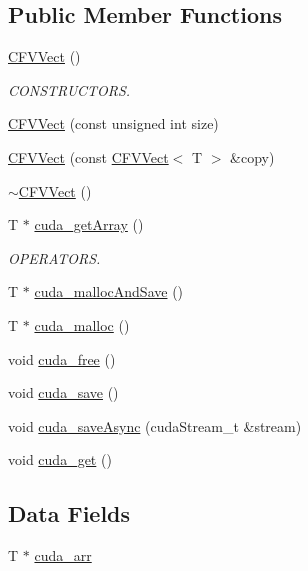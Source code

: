 \subsection*{Public Member Functions}
\begin{DoxyCompactItemize}
\item 
\hyperlink{classFVL_1_1CFVVect_a28087ccfe3e534b4d0f7170b533d3f85}{CFVVect} ()
\begin{DoxyCompactList}\small\item\em CONSTRUCTORS. \item\end{DoxyCompactList}\item 
\hyperlink{classFVL_1_1CFVVect_a82c1efb21c099ef3cfb948438c71754b}{CFVVect} (const unsigned int size)
\item 
\hyperlink{classFVL_1_1CFVVect_a018e0003ee7028fd198ce378d5a77521}{CFVVect} (const \hyperlink{classFVL_1_1CFVVect}{CFVVect}$<$ T $>$ \&copy)
\item 
\hyperlink{classFVL_1_1CFVVect_a9e41f020292fa3b80a37c17da39f5bb2}{$\sim$CFVVect} ()
\item 
T $\ast$ \hyperlink{classFVL_1_1CFVVect_a79c842ffa963500e75bb49038b5a91cf}{cuda\_\-getArray} ()
\begin{DoxyCompactList}\small\item\em OPERATORS. \item\end{DoxyCompactList}\item 
T $\ast$ \hyperlink{classFVL_1_1CFVVect_a91b72217e89ae594799cf6f5d5e790fb}{cuda\_\-mallocAndSave} ()
\item 
T $\ast$ \hyperlink{classFVL_1_1CFVVect_ac5b54e1d7aacbc7ac8f947cc8403143e}{cuda\_\-malloc} ()
\item 
void \hyperlink{classFVL_1_1CFVVect_a7da37a3af0dbb3b115a980bf13d30d02}{cuda\_\-free} ()
\item 
void \hyperlink{classFVL_1_1CFVVect_af496393c6fc22710b80e2dcb735ccce7}{cuda\_\-save} ()
\item 
void \hyperlink{classFVL_1_1CFVVect_abde9b4b5738a7aeb95290249a3035ab5}{cuda\_\-saveAsync} (cudaStream\_\-t \&stream)
\item 
void \hyperlink{classFVL_1_1CFVVect_add025b0a8b98e7d4d6e631bbaf30b088}{cuda\_\-get} ()
\end{DoxyCompactItemize}
\subsection*{Data Fields}
\begin{DoxyCompactItemize}
\item 
T $\ast$ \hyperlink{classFVL_1_1CFVVect_ac7c2eda2752dff79215dfcc062d0d814}{cuda\_\-arr}
\end{DoxyCompactItemize}
